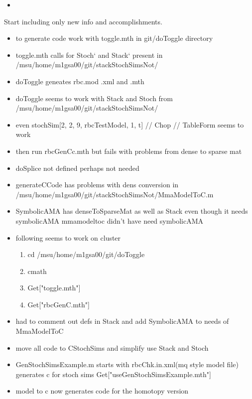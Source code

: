 \documentclass[hyperref]{labbook}
\begin{document}
\begin{itemize}
\item 
\end{itemize}




Start including only new info and accomplishments.


\begin{itemize}
\item to generate code work with toggle.mth in git/doToggle directory
\item toggle.mth calls for Stoch` and Stack` present in /msu/home/m1gsa00/git/stackStochSimsNot/
\item doToggle geneates rbc.mod .xml and .mth
\item doToggle seems to work with Stack and Stoch from /msu/home/m1gsa00/git/stackStochSimsNot/
\item even stochSim[2, 2, 9, rbcTestModel, 1, t] // Chop // TableForm seems to work
\item then run rbcGenCc.mth but fails with problems from dense to sparse mat
\item doSplice not defined perhaps not needed
\item generateCCode has problems with dens conversion in
/msu/home/m1gsa00/git/stackStochSimsNot/MmaModelToC.m
\item SymbolicAMA has denseToSparseMat as well as Stack
even though it needs symbolicAMA  mmamodeltoc didn't have need symbolicAMA
\item following seems to work on cluster

  \begin{enumerate}
  \item cd /msu/home/m1gsa00/git/doToggle
  \item cmath
  \item Get["toggle.mth"] 
  \item Get["rbcGenC.mth"]
  \end{enumerate}
\item had to comment out defs in Stack and add SymbolicAMA to needs of MmaModelToC
\item move all code to CStochSims and simplify use Stack and Stoch
\item GenStochSimsExample.m   starts with rbcChk.in.xml(mq style model file)  generates c for stoch sims  Get["useGenStochSimsExample.mth"]
\item model to c now generates code for the homotopy version

\end{itemize}
\end{document}
